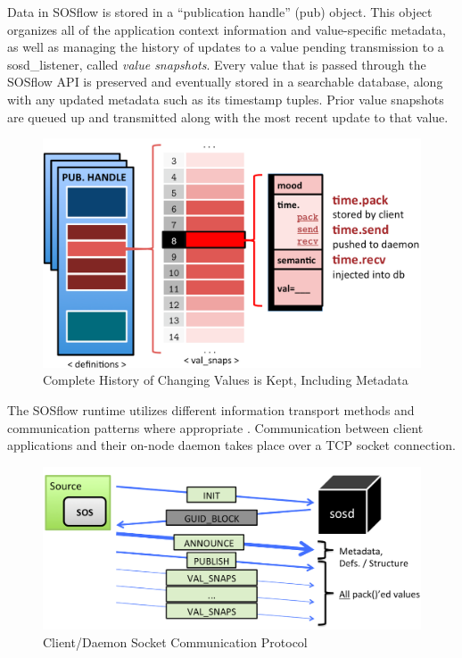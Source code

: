 
Data in SOSflow is stored in a ``publication handle'' (pub) object.
%
This object organizes all of the application context information and
value-specific metadata, as well as managing the history of updates to
a value pending transmission to a sosd\_listener, called
\textit{value snapshots}.
%
Every value that is passed through the SOSflow API is preserved and
eventually stored in a searchable database, along with any updated
metadata such as its timestamp tuples.
%
%
Prior value snapshots are queued up and transmitted along
with the most recent update to that value.
\begin{figure}[h]
\centering
\includegraphics[width=\columnwidth]{images/val_snaps.png}
\caption{Complete History of Changing Values is Kept, Including Metadata}
\label{fig_val_snaps}
\end{figure}
%
\par
%
The SOSflow runtime utilizes different information transport methods
and communication patterns where appropriate \cite{aaziz2015push}.
%
Communication between client applications and their on-node daemon
takes place over a TCP socket connection.
%
\begin{figure}[h]
\centering
\includegraphics[width=\columnwidth]{images/sosd_protocol.png}
\caption{Client/Daemon Socket Communication Protocol}
\label{fig_sosd_protocol}
\end{figure}
